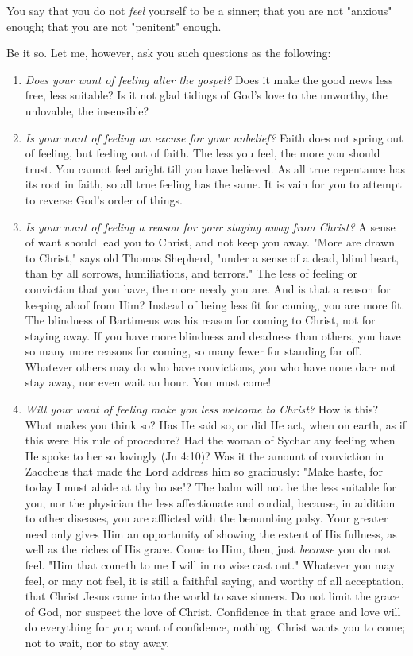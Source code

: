 \documentclass[
]{book}
\begin{document}
You say that you do not \emph{feel} yourself to be a sinner; that you are not "anxious" enough; that you are not "penitent" enough.

Be it so. Let me, however, ask you such questions as the following:

\begin{enumerate}
\def\labelenumi{\arabic{enumi}.}
\item
  \emph{Does your want of feeling alter the gospel?} Does it make the good news less free, less suitable? Is it not glad tidings of God's love to the unworthy, the unlovable, the insensible?
\item
  \emph{Is your want of feeling an excuse for your unbelief?} Faith does not spring out of feeling, but feeling out of faith. The less you feel, the more you should trust. You cannot feel aright till you have believed. As all true repentance has its root in faith, so all true feeling has the same. It is vain for you to attempt to reverse God's order of things.
\item
  \emph{Is your want of feeling a reason for your staying away from Christ?} A sense of want should lead you to Christ, and not keep you away. "More are drawn to Christ," says old Thomas Shepherd, "under a sense of a dead, blind heart, than by all sorrows, humiliations, and terrors." The less of feeling or conviction that you have, the more needy you are. And is that a reason for keeping aloof from Him? Instead of being less fit for coming, you are more fit. The blindness of Bartimeus was his reason for coming to Christ, not for staying away. If you have more blindness and deadness than others, you have so many more reasons for coming, so many fewer for standing far off. Whatever others may do who have convictions, you who have none dare not stay away, nor even wait an hour. You must come!
\item
  \emph{Will your want of feeling make you less welcome to Christ?} How is this? What makes you think so? Has He said so, or did He act, when on earth, as if this were His rule of procedure? Had the woman of Sychar any feeling when He spoke to her so lovingly (Jn 4:10)? Was it the amount of conviction in Zaccheus that made the Lord address him so graciously: "Make haste, for today I must abide at thy house"? The balm will not be the less suitable for you, nor the physician the less affectionate and cordial, because, in addition to other diseases, you are afflicted with the benumbing palsy. Your greater need only gives Him an opportunity of showing the extent of His fullness, as well as the riches of His grace. Come to Him, then, just \emph{because} you do not feel. "Him that cometh to me I will in no wise cast out." Whatever you may feel, or may not feel, it is still a faithful saying, and worthy of all acceptation, that Christ Jesus came into the world to save sinners. Do not limit the grace of God, nor suspect the love of Christ. Confidence in that grace and love will do everything for you; want of confidence, nothing. Christ wants you to come; not to wait, nor to stay away.

\end{enumerate}
\end{document}
